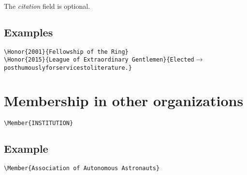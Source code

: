 \documentclass[letterpaper]{article}
\begin{document}
The \emph{citation} field is optional.

\subsection*{Examples}

\begin{alltt}
\verb|\Honor{2001}{Fellowship of the Ring}|
\verb|\Honor{2015}{League of Extraordinary Gentlemen}{Elected|\(\rightarrow\)
    posthumously for services to literature.\verb|}|
\end{alltt}


\section*{Membership in other organizations}

\begin{mdframed}
\texttt{\textbackslash Member\{INSTITUTION\}}
\end{mdframed}

\subsection*{Example}

\begin{verbatim}
\Member{Association of Autonomous Astronauts}
\end{verbatim}

\end{document}
